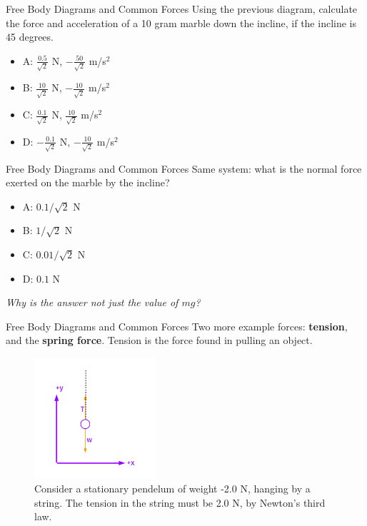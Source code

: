 \documentclass{beamer}
\begin{document}
\begin{frame}{Free Body Diagrams and Common Forces}
Using the previous diagram, calculate the force and acceleration of a 10 gram marble down the incline, if the incline is 45 degrees.
\begin{itemize}
\item A: $\frac{0.5}{\sqrt{2}}$ N, $-\frac{50}{\sqrt{2}}$ m/s$^2$
\item B: $\frac{10}{\sqrt{2}}$ N, $-\frac{10}{\sqrt{2}}$ m/s$^2$
\item C: $\frac{0.1}{\sqrt{2}}$ N, $\frac{10}{\sqrt{2}}$ m/s$^2$
\item D: $-\frac{0.1}{\sqrt{2}}$ N, $-\frac{10}{\sqrt{2}}$ m/s$^2$
\end{itemize}
\end{frame}

\begin{frame}{Free Body Diagrams and Common Forces}
Same system: what is the normal force exerted on the marble by the incline?
\begin{itemize}
\item A: $0.1/\sqrt{2}$ N
\item B: $1/\sqrt{2}$ N
\item C: $0.01/\sqrt{2}$ N
\item D: $0.1$ N
\end{itemize}
\textit{Why is the answer not just the value of $mg$?}
\end{frame}

\begin{frame}{Free Body Diagrams and Common Forces}
\small
Two more example forces: \textbf{\alert{tension}}, and the \textbf{\alert{spring force}}.  Tension is the force found in pulling an object.
\begin{figure}
\centering
\includegraphics[width=0.4\textwidth]{figures/pend.pdf}
\caption{\label{fig:pend}  Consider a stationary pendelum of weight -2.0 N, hanging by a string.  The tension in the string must be 2.0 N, by Newton's third law.}
\end{figure}
\end{frame}
\end{document}
